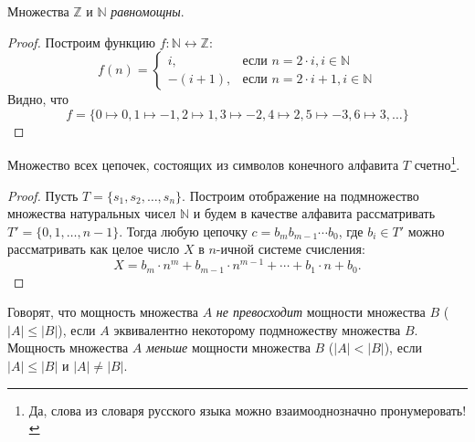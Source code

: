 \begin{exampl}
    Множества $\mathbb{Z}$ и $\mathbb{N}$ \emph{равномощны}.
\end{exampl}
\begin{proof}
    Построим функцию $f:\mathbb{N}\leftrightarrow\mathbb{Z}$:
    \[
        f(n)=
        \begin{cases}
             i,     &\text{если $n=2\cdot i,i\in\mathbb{N}$}\\
            -(i+1), &\text{если $n=2\cdot i+1,i\in\mathbb{N}$}
        \end{cases}
    \]
    Видно, что 
    \[
        f=\{0\mapsto 0,1\mapsto -1,2\mapsto 1,3\mapsto -2,4\mapsto 2,5\mapsto-3,6\mapsto 3,\ldots\}
    \]
\end{proof}

\begin{exampl}
    Множество всех цепочек, состоящих из символов конечного алфавита $T$ счетно\footnote{Да, слова из словаря русского языка можно взаимооднозначно пронумеровать!}.
\end{exampl}
\begin{proof}
    Пусть $T=\{s_1,s_2,\ldots,s_n\}$. Построим отображение на подмножество множества натуральных чисел $\mathbb{N}$ и будем в качестве алфавита рассматривать $T'=\{0,1,\ldots,n-1\}$. Тогда любую цепочку $c=b_mb_{m-1}\cdots b_0$, где $b_i\in T'$ можно рассматривать как целое число $X$ в $n$-ичной системе счисления:
    \[
        X=b_m\cdot n^m + b_{m-1}\cdot n^{m-1} + \cdots + b_1\cdot n + b_0.
    \]
\end{proof}

Говорят, что мощность множества $A$ \emph{не превосходит} мощности множества $B$ ($|A|\leq|B|$), если $A$ эквивалентно некоторому подмножеству множества $B$. Мощность множества $A$ \emph{меньше} мощности множества $B$ ($|A|<|B|$), если $|A|\leq|B|$ и $|A|\neq|B|$.

